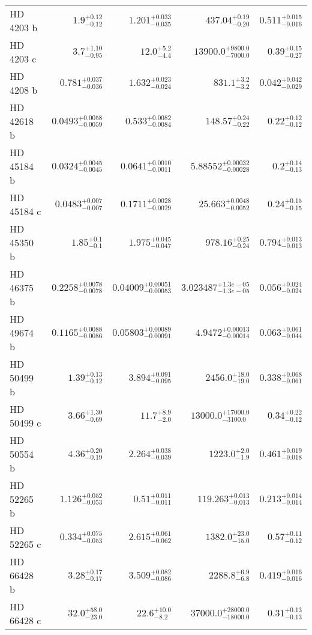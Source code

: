 \begin{longtable*}{lrrrr}
HD 4203 b & $1.9^{+0.12}_{-0.12}$ & $1.201^{+0.033}_{-0.035}$ & $437.04^{+0.19}_{-0.20}$ & $0.511^{+0.015}_{-0.016}$ \\ 
HD 4203 c & $3.7^{+1.10}_{-0.95}$ & $12.0^{+5.2}_{-4.4}$ & $13900.0^{+9800.0}_{-7000.0}$ & $0.39^{+0.15}_{-0.27}$ \\ 
HD 4208 b & $0.781^{+0.037}_{-0.036}$ & $1.632^{+0.023}_{-0.024}$ & $831.1^{+3.2}_{-3.2}$ & $0.042^{+0.042}_{-0.029}$ \\ 
HD 42618 b & $0.0493^{+0.0058}_{-0.0059}$ & $0.533^{+0.0082}_{-0.0084}$ & $148.57^{+0.24}_{-0.22}$ & $0.22^{+0.12}_{-0.12}$ \\ 
HD 45184 b & $0.0324^{+0.0045}_{-0.0045}$ & $0.0641^{+0.0010}_{-0.0011}$ & $5.88552^{+0.00032}_{-0.00028}$ & $0.2^{+0.14}_{-0.13}$ \\ 
HD 45184 c & $0.0483^{+0.007}_{-0.007}$ & $0.1711^{+0.0028}_{-0.0029}$ & $25.663^{+0.0048}_{-0.0052}$ & $0.24^{+0.15}_{-0.15}$ \\ 
HD 45350 b & $1.85^{+0.1}_{-0.1}$ & $1.975^{+0.045}_{-0.047}$ & $978.16^{+0.25}_{-0.24}$ & $0.794^{+0.013}_{-0.013}$ \\ 
HD 46375 b & $0.2258^{+0.0078}_{-0.0078}$ & $0.04009^{+0.00051}_{-0.00053}$ & $3.023487^{+1.3e-05}_{-1.3e-05}$ & $0.056^{+0.024}_{-0.024}$ \\ 
HD 49674 b & $0.1165^{+0.0088}_{-0.0086}$ & $0.05803^{+0.00089}_{-0.00091}$ & $4.9472^{+0.00013}_{-0.00014}$ & $0.063^{+0.061}_{-0.044}$ \\ 
HD 50499 b & $1.39^{+0.13}_{-0.12}$ & $3.894^{+0.091}_{-0.095}$ & $2456.0^{+18.0}_{-19.0}$ & $0.338^{+0.068}_{-0.061}$ \\ 
HD 50499 c & $3.66^{+1.30}_{-0.69}$ & $11.7^{+8.9}_{-2.0}$ & $13000.0^{+17000.0}_{-3100.0}$ & $0.34^{+0.22}_{-0.12}$ \\ 
HD 50554 b & $4.36^{+0.20}_{-0.19}$ & $2.264^{+0.038}_{-0.039}$ & $1223.0^{+2.0}_{-1.9}$ & $0.461^{+0.019}_{-0.018}$ \\ 
HD 52265 b & $1.126^{+0.052}_{-0.053}$ & $0.51^{+0.011}_{-0.011}$ & $119.263^{+0.013}_{-0.013}$ & $0.213^{+0.014}_{-0.014}$ \\ 
HD 52265 c & $0.334^{+0.075}_{-0.053}$ & $2.615^{+0.061}_{-0.062}$ & $1382.0^{+23.0}_{-15.0}$ & $0.57^{+0.11}_{-0.12}$ \\ 
HD 66428 b & $3.28^{+0.17}_{-0.17}$ & $3.509^{+0.082}_{-0.086}$ & $2288.8^{+6.9}_{-6.8}$ & $0.419^{+0.016}_{-0.016}$ \\ 
HD 66428 c & $32.0^{+58.0}_{-23.0}$ & $22.6^{+10.0}_{-8.2}$ & $37000.0^{+28000.0}_{-18000.0}$ & $0.31^{+0.13}_{-0.13}$ \\ 

\end{longtable*}
